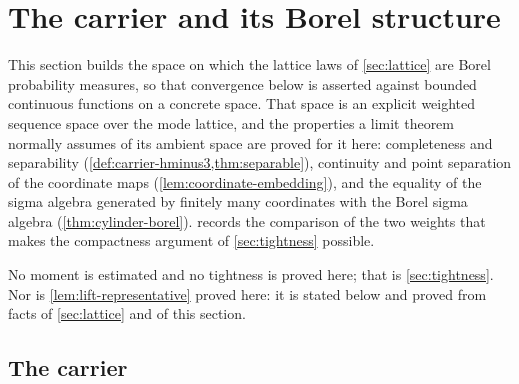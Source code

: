 %
\section{The carrier and its Borel structure}\label{sec:carrier}

This section builds the space on which the lattice laws of \cref{sec:lattice}
are Borel probability measures, so that convergence below is asserted against
bounded continuous functions on a concrete space. That space is an explicit
weighted sequence space over the mode lattice, and the properties a limit
theorem normally assumes of its ambient space are proved for it here:
completeness and separability (\cref{def:carrier-hminus3,thm:separable}),
continuity and point separation of the coordinate maps
(\cref{lem:coordinate-embedding}), and the equality of the sigma algebra
generated by finitely many coordinates with the Borel sigma algebra
(\cref{thm:cylinder-borel}).  records the comparison of
the two weights that makes the compactness argument of \cref{sec:tightness}
possible.

No moment is estimated and no tightness is proved here; that is
\cref{sec:tightness}. Nor is \cref{lem:lift-representative} proved here: it is
stated below and proved from facts of \cref{sec:lattice} and of this section.

\subsection{The carrier}

